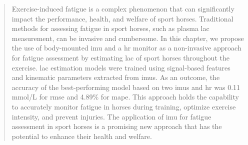\begin{quote}

Exercise-induced fatigue is a complex phenomenon that can significantly impact the performance, health, and welfare of sport horses. Traditional methods for assessing fatigue in sport horses, such as plasma \gls{lac} measurement, can be invasive and cumbersome. In this chapter, we propose the use of body-mounted \gls{imu} and a \gls{hr} monitor as a non-invasive approach for fatigue assessment by estimating \gls{lac} of sport horses throughout the exercise. \gls{lac} estimation models were trained using signal-based features and kinematic parameters extracted from \gls{imu}s. As an outcome, the accuracy of the best-performing model based on two \gls{imu}s and \gls{hr} was 0.11 \gls{mmol/L} for \gls{rmse} and 4.89\% for \gls{mape}. This approach holds the capability to accurately monitor fatigue in horses during training, optimize exercise intensity, and prevent injuries.  The application of \gls{imu} for fatigue assessment in sport horses is a promising new approach that has the potential to enhance their health and welfare.

\end{quote}

